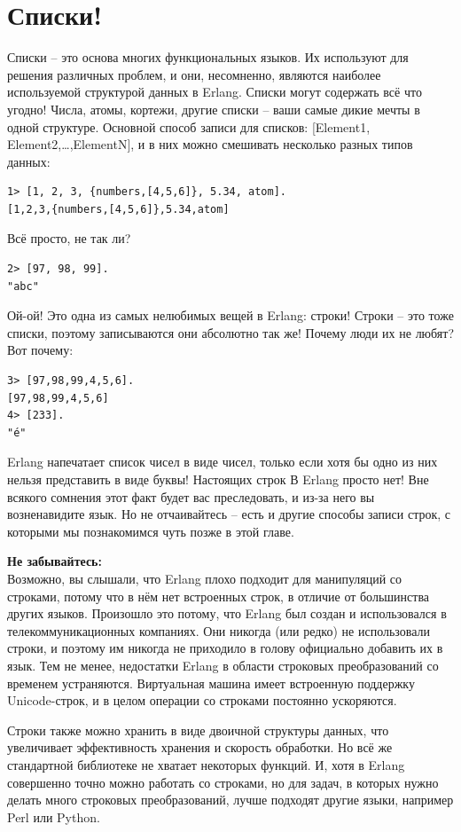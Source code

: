 \documentclass[a4paper,12pt]{report}
\newcommand{\ops}{\colorbox{lgreen}}
\begin{document}
\section{Списки!}
\label{lists}
Списки \--- это основа многих функциональных языков. Их используют для решения различных проблем, и они, несомненно, являются наиболее используемой структурой данных в Erlang. Списки могут содержать всё что угодно! Числа, атомы, кортежи, другие списки \--- ваши самые дикие мечты в одной структуре. Основной способ записи для списков: \ops{[Element1, Element2,\ldots,ElementN]}, и в них можно смешивать несколько разных типов данных:
\begin{lstlisting}[style=repl]
1> [1, 2, 3, {numbers,[4,5,6]}, 5.34, atom].
[1,2,3,{numbers,[4,5,6]},5.34,atom]
\end{lstlisting}

Всё просто, не так ли?
\begin{lstlisting}[style=repl]
2> [97, 98, 99].
"abc"
\end{lstlisting}

Ой\--ой! Это одна из самых нелюбимых вещей в Erlang: строки! Строки \--- это тоже списки, поэтому записываются они абсолютно так же! Почему люди их не любят? Вот почему:
\begin{lstlisting}[style=repl]
3> [97,98,99,4,5,6].
[97,98,99,4,5,6]
4> [233].
"é"
\end{lstlisting}

Erlang напечатает список чисел в виде чисел, только если хотя бы одно из них нельзя представить в виде буквы! Настоящих строк В Erlang просто нет! Вне всякого сомнения этот факт будет вас преследовать, и из\--за него вы возненавидите язык. Но не отчаивайтесь \--- есть и другие способы записи строк, с которыми мы познакомимся чуть позже в этой главе.\\ 
\colorbox{lorange}
{
    \begin{minipage}{1.0\linewidth}
        \textbf{Не забывайтесь:}\\ 
        Возможно, вы слышали, что Erlang плохо подходит для манипуляций со строками, потому что в нём нет встроенных строк, в отличие от большинства других языков. Произошло это потому, что Erlang был создан и использовался в телекоммуникационных компаниях. Они никогда (или редко) не использовали строки, и поэтому им никогда не приходило в голову официально добавить их в язык. Тем не менее, недостатки Erlang в области строковых преобразований со временем устраняются. Виртуальная машина имеет встроенную поддержку Unicode\--строк, и в целом операции со строками постоянно ускоряются.
        
        Строки также можно хранить в виде двоичной структуры данных, что увеличивает эффективность хранения и скорость обработки. Но всё же стандартной библиотеке не хватает некоторых функций. И, хотя в Erlang совершенно точно можно работать со строками, но для задач, в которых нужно делать много строковых преобразований, лучше подходят другие языки, например Perl или Python.
    \end{minipage}
}
\end{document}
